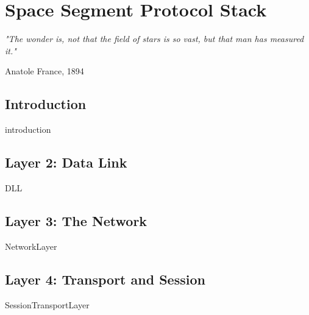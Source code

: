 \chapter{Space Segment Protocol Stack}

%

\epigraph{\textit{"The wonder is, not that the field of stars is so vast, but that man has measured it."}}{Anatole France, 1894} 

\section{Introduction}
{introduction}

\section{Layer 2: Data Link}
{DLL}

\section{Layer 3: The Network}
{NetworkLayer}

\section{Layer 4: Transport and Session}
{SessionTransportLayer}
